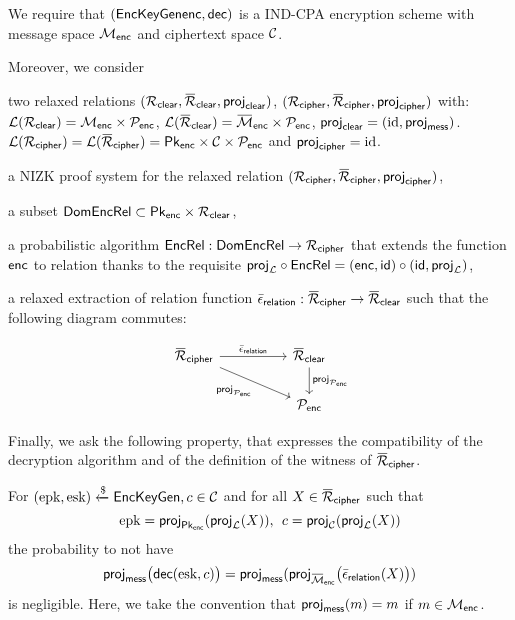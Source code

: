 	We require that $(\mathsf{EncKeyGen} \textsf{enc}, \textsf{dec})$ is a IND-CPA 
encryption scheme with message space $\mathcal{M}_{\mathsf{enc}}$ and ciphertext space 
$\mathcal{C}$.

Moreover, we consider 
	\begin{compactitem}
		\item two relaxed relations $(\relationclear, \barrelationclear,
\projclear)$, $(\relationcipher, \barrelationcipher,\allowbreak \projcipher)$ 
			with:
		$\mathcal{L}(\mathcal{R}_{\mathsf{clear}}) = \mathcal{M}_{\mathsf{enc}} \times \mathcal{P}_{\mathsf{enc}}$,
		$\Language{\barrelationclear} = \SetRelMessEnc \times \SetPubEnc$, $\projclear =
	(\idfunction, \projenc)$. 
		$\Language{\relationcipher} = \Language{\barrelationcipher} = \SetPublicKeysEnc \times \SetCipherEnc \times
	\SetPubEnc$ and $\projcipher = \idfunction$.

	\item a NIZK proof system for the relaxed relation 
$(\relationcipher, \barrelationcipher,\allowbreak \projcipher)$,


 \item a subset $\mathsf{DomEncRel} \subset \mathsf{Pk}_{\mathsf{enc}} \times \mathcal{R}_{\mathsf{clear}}$,

\item a probabilistic algorithm $\mathsf{EncRel}: \mathsf{DomEncRel} \rightarrow 
\mathcal{R}_{\mathsf{cipher}}$ that extends the function $\textsf{enc}$ to relation thanks to 
the requisite $\projL \circ \EncRel = (\Enc, \id) \circ (\id, \projL)$,

\item a relaxed extraction of relation function $\barextractionrelation 
:\barrelationcipher \rightarrow \barrelationclear$ such that the 
following diagram commutes:

\[ \begin{tikzcd}
	\barrelationcipher \arrow{rr}{\barextractionrelation}
	\arrow[swap]{drr}{\proj_{\SetPubEnc}}
	 &&\barrelationclear \arrow{d}{\proj_{\SetPubEnc}} \\
	&& \SetPubEnc\end{tikzcd} \]
\end{compactitem}
	Finally, we ask the following property, that expresses
	the compatibility of the decryption algorithm and of the definition of the witness of
	$\barrelationcipher$.
	\begin{compactitem}
	\item For $(\text{epk}, \text{esk}) \xleftarrow{\$} \mathsf{EncKeyGen}, c \in \mathcal{C}$ and for all $X \in \barrelationcipher$ such
		that \[\epk = \proj[\SetPublicKeysEnc](\projL(X)),\:\: \cipher = \proj_{\SetCipherEnc}(\projL(X))\]
	the probability to not have
	\[ \projenc\big(\Dec(\esk, \cipher)\big) = \projenc(\proj_{\SetRelMessEnc}\big(\barextractionrelation(X)\big))\]
	is negligible. Here, we take the convention that $\projenc(m) = m$ if $m \in \mathcal{M}_{\mathsf{enc}}$.
\end{compactitem}


